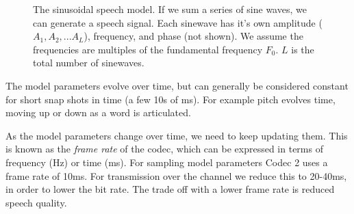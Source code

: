 \documentclass{article}
\begin{document}
\begin{figure}[h]
\caption{The sinusoidal speech model.  If we sum a series of sine waves, we can generate a speech signal.  Each sinewave has it's own amplitude ($A_1,A_2,... A_L$), frequency, and phase (not shown).  We assume the frequencies are multiples of the fundamental frequency $F_0$. $L$ is the total number of sinewaves.}
\label{fig:sinusoidal_model}
\begin{center}
\end{center}
\end{figure}

The model parameters evolve over time, but can generally be considered constant for short snap shots in time (a few 10s of ms).  For example pitch evolves time, moving up or down as a word is articulated.

As the model parameters change over time, we need to keep updating them.  This is known as the \emph{frame rate} of the codec, which can be expressed in terms of frequency (Hz) or time (ms).  For sampling model parameters Codec 2 uses a frame rate of 10ms.  For transmission over the channel we reduce this to 20-40ms, in order to lower the bit rate.  The trade off with a lower frame rate is reduced speech quality.
\end{document}

